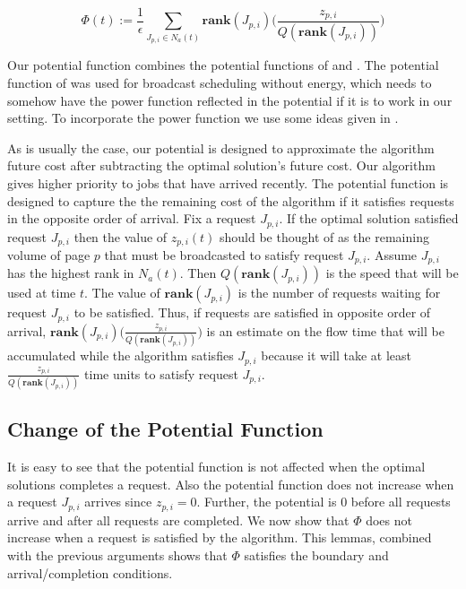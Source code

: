 \documentclass[11pt]{article}
\newcommand{\eps}{\epsilon}
\newcommand{\rank}{\mathbf{rank}}
\begin{document}
$$\Phi(t) := \frac{1}{\eps} \sum_{J_{p,i} \in N_a(t)}   \rank(J_{p,i}) \Big ( \frac{ z_{p,i}}{Q(\rank(J_{p,i}))} \Big)$$

 Our potential function combines the potential functions of \cite{BansalKN09} and \cite{GuptaKP10}. The potential function of \cite{BansalKN09} was used for broadcast scheduling without energy, which needs to somehow have the power function reflected in the potential if it is to work in our setting. To incorporate the power function we use some ideas given in \cite{GuptaKP10}.   

As is usually the case, our potential is designed to approximate the algorithm future cost after subtracting the optimal solution's future cost.    Our algorithm gives higher priority to jobs that have arrived recently.  The potential function is designed to capture the the remaining cost of the algorithm if it satisfies requests in the opposite order of arrival.    Fix a request $J_{p,i}$.  If the optimal solution satisfied request $J_{p,i}$ then the value of $z_{p,i}(t)$ should be thought of as the remaining volume of page $p$ that must be broadcasted to satisfy request $J_{p,i}$.  Assume $J_{p,i}$ has the highest rank in $N_a(t)$. Then $Q(\rank(J_{p,i}))$ is the speed that will be used at time $t$.  The value of $\rank(J_{p,i})$ is the number of requests waiting for request $J_{p,i}$ to be satisfied. Thus,  if requests are satisfied in opposite order of arrival, $\rank(J_{p,i}) \Big ( \frac{ z_{p,i}}{Q(\rank(J_{p,i}))} \Big )$ is an estimate on the flow time that will be accumulated while the algorithm satisfies $J_{p,i}$ because it will take at least $\frac{ z_{p,i}}{Q(\rank(J_{p,i}))}$ time units to satisfy request $J_{p,i}$.

\subsection{Change of the Potential Function}


It is easy to see that the potential function is not affected when the optimal solutions completes a request. Also the potential function does not increase when a request $J_{p,i}$ arrives since $z_{p,i}=0$. Further, the potential is $0$ before all requests arrive and after all requests are completed.  We now show that $\Phi$ does not increase when a request is satisfied by the algorithm.  This lemmas, combined with the previous arguments shows that $\Phi$ satisfies the boundary and arrival/completion conditions.
\end{document}
